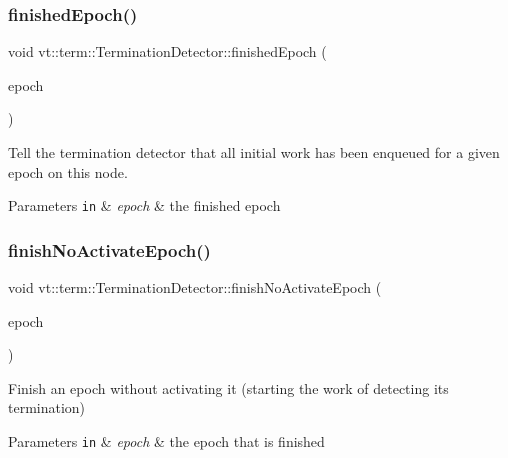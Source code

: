 \subsubsection{\texorpdfstring{finished\+Epoch()}{finishedEpoch()}}
{\footnotesize\ttfamily void vt\+::term\+::\+Termination\+Detector\+::finished\+Epoch (\begin{DoxyParamCaption}\item[{\hyperlink{namespacevt_a81d11b28122d43bf9834577e4a06440f}{Epoch\+Type} const \&}]{epoch }\end{DoxyParamCaption})}



Tell the termination detector that all initial work has been enqueued for a given epoch on this node. 


\begin{DoxyParams}[1]{Parameters}
\mbox{\tt in}  & {\em epoch} & the finished epoch \\
\hline
\end{DoxyParams}
\mbox{\label{structvt_1_1term_1_1_termination_detector_a349739e9ee6dea98a863b4afb1e49c10}} 
\subsubsection{\texorpdfstring{finish\+No\+Activate\+Epoch()}{finishNoActivateEpoch()}}
{\footnotesize\ttfamily void vt\+::term\+::\+Termination\+Detector\+::finish\+No\+Activate\+Epoch (\begin{DoxyParamCaption}\item[{\hyperlink{namespacevt_a81d11b28122d43bf9834577e4a06440f}{Epoch\+Type} const \&}]{epoch }\end{DoxyParamCaption})}



Finish an epoch without activating it (starting the work of detecting its termination) 


\begin{DoxyParams}[1]{Parameters}
\mbox{\tt in}  & {\em epoch} & the epoch that is finished \\
\hline
\end{DoxyParams}
\mbox{\label{structvt_1_1term_1_1_termination_detector_a3b1e4a0d87c5af08fc36925ec74504fd}} 
